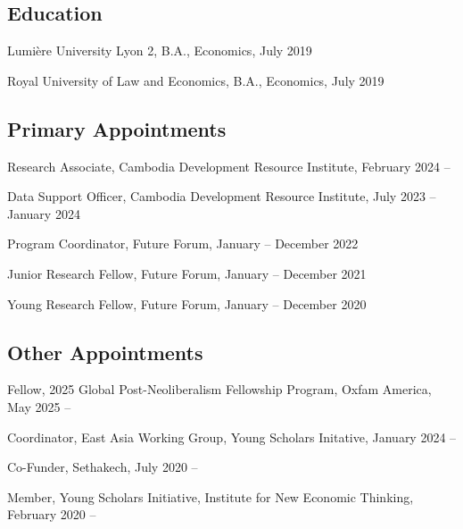 \documentclass[10pt,a4paper]{article}
\begin{document}
\subsection*{Education}
	
	Lumière University Lyon 2, B.A., Economics, July 2019
	
	Royal University of Law and Economics, B.A., Economics, July 2019 
	

\subsection*{Primary Appointments}	


		Research Associate, Cambodia Development Resource Institute,  February 2024 --
		
		Data Support Officer, Cambodia Development Resource Institute, July 2023 -- January 2024
		
		Program Coordinator, Future Forum, January -- December 2022
		
		Junior Research Fellow, Future Forum, January -- December 2021
		
		Young Research Fellow, Future Forum, January -- December 2020

\subsection*{Other Appointments}
	
	Fellow, 2025 Global Post-Neoliberalism Fellowship Program, Oxfam America, May 2025 --
	
	Coordinator, East Asia Working Group, Young Scholars Initative, January 2024 --
		
	Co-Funder, Sethakech, July 2020 --
	
	Member, Young Scholars Initiative, Institute for New Economic Thinking, February 2020 --

\end{document}
